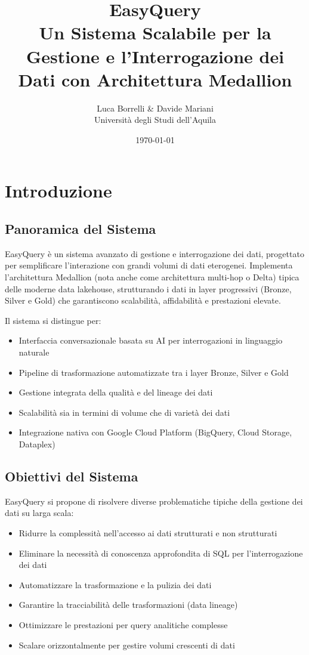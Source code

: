 \documentclass[11pt,a4paper,twoside]{report}
\title{\Huge{\textbf{EasyQuery}}\\\Large{Un Sistema Scalabile per la Gestione e l'Interrogazione dei Dati con Architettura Medallion}}
\author{Luca Borrelli \& Davide Mariani\\Università degli Studi dell'Aquila}
\date{\today}
\begin{document}
\maketitle
\tableofcontents

\chapter{Introduzione}

\section{Panoramica del Sistema}
EasyQuery è un sistema avanzato di gestione e interrogazione dei dati, progettato per semplificare l'interazione con grandi volumi di dati eterogenei. Implementa l'architettura Medallion (nota anche come architettura multi-hop o Delta) tipica delle moderne data lakehouse, strutturando i dati in layer progressivi (Bronze, Silver e Gold) che garantiscono scalabilità, affidabilità e prestazioni elevate.

Il sistema si distingue per:
\begin{itemize}
    \item Interfaccia conversazionale basata su AI per interrogazioni in linguaggio naturale
    \item Pipeline di trasformazione automatizzate tra i layer Bronze, Silver e Gold
    \item Gestione integrata della qualità e del lineage dei dati
    \item Scalabilità sia in termini di volume che di varietà dei dati
    \item Integrazione nativa con Google Cloud Platform (BigQuery, Cloud Storage, Dataplex)
\end{itemize}

\section{Obiettivi del Sistema}
EasyQuery si propone di risolvere diverse problematiche tipiche della gestione dei dati su larga scala:
\begin{itemize}
    \item Ridurre la complessità nell'accesso ai dati strutturati e non strutturati
    \item Eliminare la necessità di conoscenza approfondita di SQL per l'interrogazione dei dati
    \item Automatizzare la trasformazione e la pulizia dei dati
    \item Garantire la tracciabilità delle trasformazioni (data lineage)
    \item Ottimizzare le prestazioni per query analitiche complesse
    \item Scalare orizzontalmente per gestire volumi crescenti di dati
\end{itemize}
\end{document}
